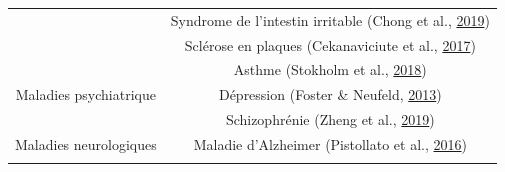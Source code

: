 \documentclass[12pt,a4paper]{reedthesis}
\theoremstyle{definition}
\theoremstyle{definition}
\theoremstyle{definition}
\theoremstyle{remark}
\begin{document}
\begin{longtable}[]{@{}cc@{}}
\begin{minipage}[t]{0.31\columnwidth}
\strut
\end{minipage} & \begin{minipage}[t]{0.63\columnwidth}\centering
Syndrome de l'intestin irritable (Chong et al., \protect\hyperlink{ref-chong2019microbiome}{2019})\strut
\end{minipage}\tabularnewline
\begin{minipage}[t]{0.31\columnwidth}\centering
\strut
\end{minipage} & \begin{minipage}[t]{0.63\columnwidth}\centering
Sclérose en plaques (Cekanaviciute et al., \protect\hyperlink{ref-cekanaviciute2017gut}{2017})\strut
\end{minipage}\tabularnewline
\begin{minipage}[t]{0.31\columnwidth}\centering
\strut
\end{minipage} & \begin{minipage}[t]{0.63\columnwidth}\centering
Asthme (Stokholm et al., \protect\hyperlink{ref-stokholm2018maturation}{2018})\strut
\end{minipage}\tabularnewline
\begin{minipage}[t]{0.31\columnwidth}\centering
Maladies psychiatrique\strut
\end{minipage} & \begin{minipage}[t]{0.63\columnwidth}\centering
Dépression (Foster \& Neufeld, \protect\hyperlink{ref-foster2013gut}{2013})\strut
\end{minipage}\tabularnewline
\begin{minipage}[t]{0.31\columnwidth}\centering
\strut
\end{minipage} & \begin{minipage}[t]{0.63\columnwidth}\centering
Schizophrénie (Zheng et al., \protect\hyperlink{ref-zheng2019gut}{2019})\strut
\end{minipage}\tabularnewline
\begin{minipage}[t]{0.31\columnwidth}\centering
Maladies neurologiques\strut
\end{minipage} & \begin{minipage}[t]{0.63\columnwidth}\centering
Maladie d'Alzheimer (Pistollato et al., \protect\hyperlink{ref-pistollato2016role}{2016})\strut
\end{minipage}\tabularnewline
\begin{minipage}[t]{0.31\columnwidth}\centering
\strut
\end{minipage} & \begin{minipage}[t]{0.63\columnwidth}\centering

\end{minipage}
\end{longtable}
\end{document}
